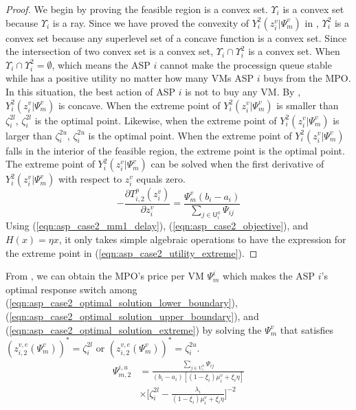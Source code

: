 \documentclass[conference]{IEEEtran}
\begin{document}
\begin{proof}
We begin by proving the feasible region is a convex set. $\Upsilon_i$ is a convex set because $\Upsilon_i$ is a ray. Since we have proved the convexity of $Y_i^2(z_i^v|\Psi_m^v)$ in , $\Upsilon_i^2$ is a convex set because any superlevel set of a concave function is a convex set. Since the intersection of two convex set is a convex set, $\Upsilon_i \cap \Upsilon_i^2$ is a convex set. When $\Upsilon_i \cap \Upsilon_i^2 = \emptyset$, which means the ASP $i$ cannot make the processign queue stable while has a positive utility no matter how many VMs ASP $i$ buys from the MPO. In this situation, the best action of ASP $i$ is not to buy any VM. By , $Y_i^2(z_i^v|\Psi_m^v)$ is concave. When the extreme point of $Y_i^2(z_i^v|\Psi_m^v)$ is smaller than $\zeta_i^{2l}$, $\zeta_i^{2l}$ is the optimal point. Likewise, when the extreme point of $Y_i^2(z_i^v|\Psi_m^v)$ is larger than $\zeta_i^{2u}$, $\zeta_i^{2u}$ is the optimal point. When the extreme point of $Y_i^2(z_i^v|\Psi_m^v)$ falls in the interior of the feasible region, the extreme point is the optimal point. The extreme point of $Y_i^2(z_i^v|\Psi_m^v)$ can be solved when the first derivative of $Y_i^2(z_i^v|\Psi_m^v)$ with respect to $z_i^v$ equals zero.
\begin{equation} \label{eqn:asp_case2_utility_first_deriv}
-\frac{\partial T_{i,2}^p(z_i^v)}{\partial z_i^v} = \frac{\Psi_m^v (b_i - a_i)}{\sum_{j \in \mathsf{U}_i^n} \Psi_{ij}}
\end{equation}
Using (\ref{eqn:asp_case2_mm1_delay}), (\ref{eqn:asp_case2_objective}), and $H(x)=\eta x$, it only takes simple algebraic operations to have the expression for the extreme point in (\ref{eqn:asp_case2_utility_extreme}). \qedhere
\end{proof}
From , we can obtain the MPO's price per VM $\Psi_m^i$ which makes the ASP $i$'s optimal response switch among (\ref{eqn:asp_case2_optimal_solution_lower_boundary}), (\ref{eqn:asp_case2_optimal_solution_upper_boundary}), and (\ref{eqn:asp_case2_optimal_solution_extreme}) by solving the $\Psi_m^v$ that satisfies $(z_{i,2}^{v,e}(\Psi_m^v))^* = \zeta_i^{2l}$ or $(z_{i,2}^{v,e}(\Psi_m^v))^* = \zeta_i^{2u}$. 
\begin{equation} 
\begin{aligned}
\Psi_{m,2}^{i,u}&= \frac{\sum_{j \in \mathrm{U}_i^n}\Psi_{ij}}{(b_i-a_i)[(1-\xi_i)\mu_i^v + \xi_i \eta]} \\
& \times \big[\zeta_i^{2l} - \frac{\lambda_i}{(1-\xi_i)\mu_i^v + \xi_i\eta}\big]^{-2} 
\end{aligned}
\end{equation}
\end{document}
